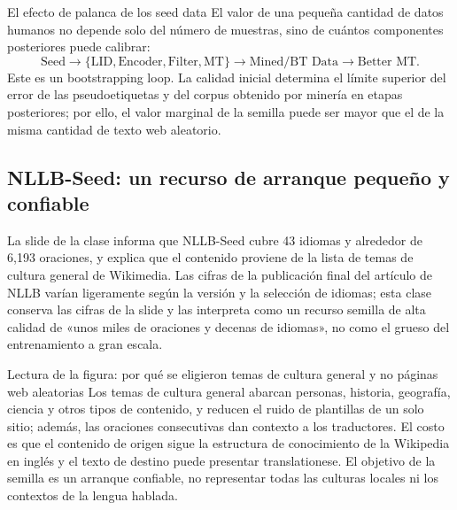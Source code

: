 \begin{importantbox}{El efecto de palanca de los seed data}
El valor de una pequeña cantidad de datos humanos no depende solo del número de muestras, sino de cuántos componentes posteriores puede calibrar:
\[
\text{Seed}\rightarrow\{\text{LID},\text{Encoder},\text{Filter},\text{MT}\}
\rightarrow\text{Mined/BT Data}\rightarrow\text{Better MT}.
\]
Este es un bootstrapping loop. La calidad inicial determina el límite superior del error de las pseudoetiquetas y del corpus obtenido por minería en etapas posteriores; por ello, el valor marginal de la semilla puede ser mayor que el de la misma cantidad de texto web aleatorio.
\end{importantbox}

\subsection{NLLB-Seed: un recurso de arranque pequeño y confiable}

La slide de la clase informa que NLLB-Seed cubre 43 idiomas y alrededor de 6,193 oraciones, y explica que el contenido proviene de la lista de temas de cultura general de Wikimedia. Las cifras de la publicación final del artículo de NLLB varían ligeramente según la versión y la selección de idiomas; esta clase conserva las cifras de la slide y las interpreta como un recurso semilla de alta calidad de «unos miles de oraciones y decenas de idiomas», no como el grueso del entrenamiento a gran escala.


\begin{knowledgebox}{Lectura de la figura: por qué se eligieron temas de cultura general y no páginas web aleatorias}
Los temas de cultura general abarcan personas, historia, geografía, ciencia y otros tipos de contenido, y reducen el ruido de plantillas de un solo sitio; además, las oraciones consecutivas dan contexto a los traductores. El costo es que el contenido de origen sigue la estructura de conocimiento de la Wikipedia en inglés y el texto de destino puede presentar translationese. El objetivo de la semilla es un arranque confiable, no representar todas las culturas locales ni los contextos de la lengua hablada.
\end{knowledgebox}


